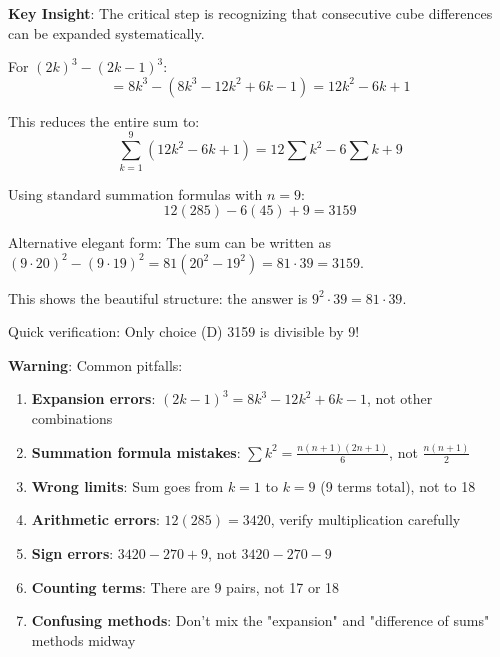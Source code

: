 \documentclass[12pt]{article}
\begin{document}
\begin{keyinsightbox}
\textbf{Key Insight}: The critical step is recognizing that consecutive cube differences can be expanded systematically.

For $(2k)^3 - (2k-1)^3$:
$$= 8k^3 - (8k^3 - 12k^2 + 6k - 1) = 12k^2 - 6k + 1$$

This reduces the entire sum to:
$$\sum_{k=1}^{9} (12k^2 - 6k + 1) = 12\sum k^2 - 6\sum k + 9$$

Using standard summation formulas with $n=9$:
$$12(285) - 6(45) + 9 = 3159$$

Alternative elegant form: The sum can be written as $(9 \cdot 20)^2 - (9 \cdot 19)^2 = 81(20^2 - 19^2) = 81 \cdot 39 = 3159$.

This shows the beautiful structure: the answer is $9^2 \cdot 39 = 81 \cdot 39$.

Quick verification: Only choice (D) 3159 is divisible by 9!
\end{keyinsightbox}

\begin{warningbox}
\textbf{Warning}: Common pitfalls:
\begin{enumerate}
    \item \textbf{Expansion errors}: $(2k-1)^3 = 8k^3 - 12k^2 + 6k - 1$, not other combinations
    \item \textbf{Summation formula mistakes}: $\sum k^2 = \frac{n(n+1)(2n+1)}{6}$, not $\frac{n(n+1)}{2}$
    \item \textbf{Wrong limits}: Sum goes from $k=1$ to $k=9$ (9 terms total), not to 18
    \item \textbf{Arithmetic errors}: $12(285) = 3420$, verify multiplication carefully
    \item \textbf{Sign errors}: $3420 - 270 + 9$, not $3420 - 270 - 9$
    \item \textbf{Counting terms}: There are 9 pairs, not 17 or 18
    \item \textbf{Confusing methods}: Don't mix the "expansion" and "difference of sums" methods midway
\end{enumerate}
\end{warningbox}
\end{document}
